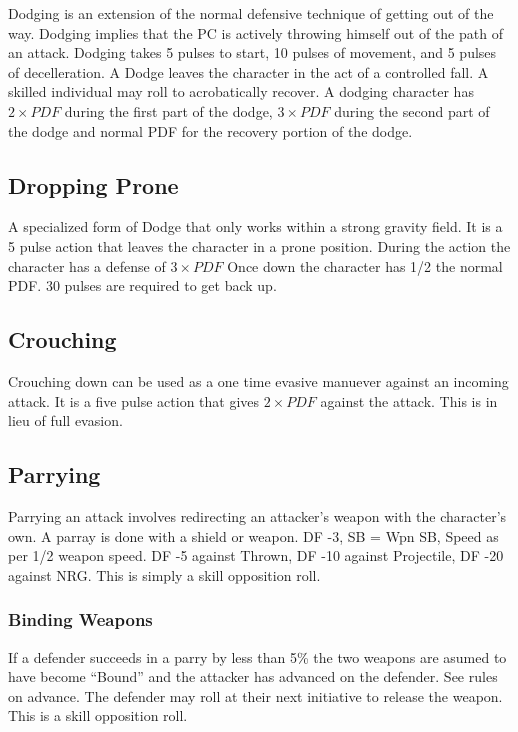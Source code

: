 Dodging is an extension of the normal defensive technique of getting out
of the way. Dodging implies that the PC is actively throwing himself out
of the path of an attack. Dodging takes 5 pulses to start, 10 pulses of movement, 
and 5 pulses of decelleration. A Dodge leaves the character in the act of 
a controlled fall. A skilled individual may roll to acrobatically recover. 
A dodging character has \( 2 \times PDF \) during the first part of the dodge, 
\( 3 \times PDF \) during the second part of the dodge and normal PDF for 
the recovery portion of the dodge.

\subsection{Dropping Prone}

A specialized form of Dodge that only works within a strong gravity
field. It is a 5 pulse action that leaves the character in a prone
position. During the action the character has a defense of \( 3 \times PDF \)
Once down the character has 1/2 the normal PDF. 30 pulses are required to 
get back up.

\subsection{Crouching}

Crouching down can be used as a one time evasive manuever against an
incoming attack. It is a five pulse action that gives \( 2 \times PDF \)
against the attack. This is in lieu of full evasion. 

\subsection{Parrying}

Parrying an attack involves redirecting an attacker's weapon with the
character's own. A parray is done with a shield or weapon. DF -3, SB = Wpn SB, 
Speed as per 1/2 weapon speed. DF -5 against Thrown, DF -10 against Projectile, 
DF -20 against NRG. This is simply a skill opposition roll. 

\subsubsection{Binding Weapons}

If a defender succeeds in a parry by less than 5\% the two weapons are asumed
to have become ``Bound'' and the attacker has advanced on the defender. See rules 
on advance. The defender may roll at their next initiative to release the weapon. 
This is a skill opposition roll. 

